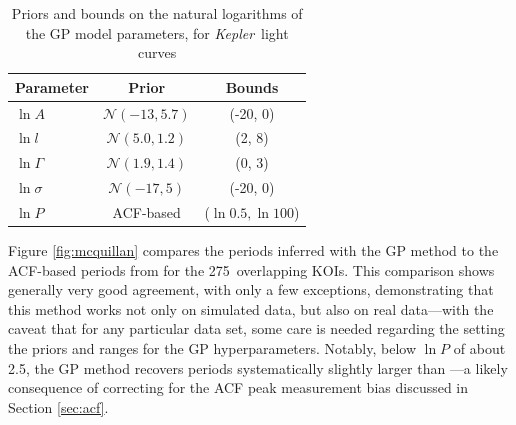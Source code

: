 \documentclass[useAMS, usenatbib, preprint, 12pt]{aastex}
\newcommand{\Kepler}{{\it Kepler}}
\newcommand{\nkoimcq}{275}
\begin{document}
\begin{table}
\begin{center}
\caption{Priors and bounds on the natural logarithms of the GP model parameters,
        for \Kepler\ light curves}
\begin{tabular}{lcc}
Parameter & Prior & Bounds\\
    \hline
    $\ln A$ & $\mathcal N(-13, 5.7)$ & (-20, 0) \\
    $\ln l$ & $\mathcal N(5.0, 1.2)$ & (2, 8) \\
    $\ln \Gamma$ & $\mathcal N(1.9, 1.4)$ & (0, 3) \\
    $\ln \sigma$ & $\mathcal N(-17, 5)$ & (-20, 0) \\
    $\ln P $ & ACF-based & ($\ln 0.5, \ln 100$) \\
\end{tabular}
\end{center}
\end{table}
\label{tab:koipriors}

Figure \ref{fig:mcquillan} compares the periods inferred with the GP method to
the ACF-based periods from \citet{Mcquillan2013} for the \nkoimcq\ overlapping
KOIs.
This comparison shows generally very good agreement, with only a few
exceptions, demonstrating that this method works not only on simulated data,
but also on real data---with the caveat that for any particular data set, some
care is needed regarding the setting the priors and ranges for the GP
hyperparameters.
Notably, below $\ln P$ of about 2.5, the GP method recovers periods
systematically slightly larger than \citet{Mcquillan2013}---a likely consequence
of correcting for the ACF peak measurement bias discussed in Section \ref{sec:acf}.
\end{document}
